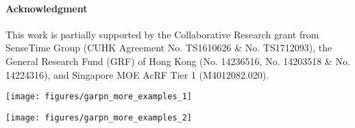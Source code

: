 \documentclass[10pt,twocolumn,letterpaper]{article}
\newcommand{\algname}{GA-RPN}
\begin{document}
\vspace{-10pt}

\paragraph{Acknowledgment}
This work is partially supported by the Collaborative Research grant from SenseTime Group (CUHK Agreement No. TS1610626 \& No. TS1712093), the General Research Fund (GRF) of Hong Kong (No. 14236516, No. 14203518 \& No. 14224316), and Singapore MOE AcRF Tier 1 (M4012082.020).
 

\appendix

\begin{figure*}[h]
	\begin{center}
		\texttt{[image: figures/garpn\_more\_examples\_1]}
		\label{fig:examples1}
	\end{center}
	\vspace{3cm}
\end{figure*}

\begin{figure*}[h]
	\begin{center}
		\texttt{[image: figures/garpn\_more\_examples\_2]}
		\caption{Examples of RPN proposals (top row) and \algname~proposals (bottom row).}\label{fig:examples2}
	\end{center}\end{figure*} 
{\small
	
	
}
\end{document}
